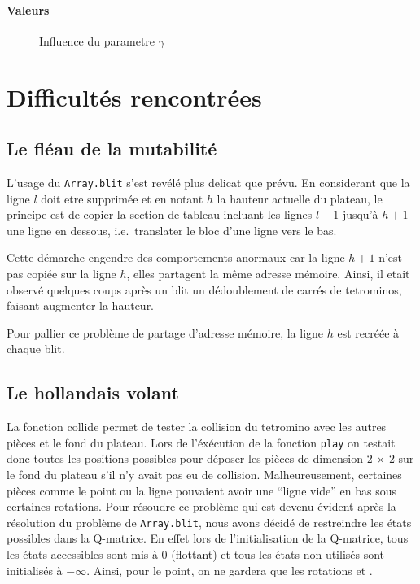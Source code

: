 \documentclass{article}
\begin{document}
\paragraph{Valeurs}
\begin{figure}
  \centering
  \caption{Influence du parametre \(\gamma\)}
\end{figure}


\section{Difficultés rencontrées}

\subsection{Le fl\'eau de la mutabilit\'e}
L'usage du \texttt{Array.blit} s'est revélé plus delicat que prévu. En
considerant que la ligne \(l\) doit etre supprimée et en notant \(h\) la hauteur
actuelle du plateau, le principe est de copier la section de tableau incluant
les lignes \(l+1\) jusqu'à \(h+1\) une ligne en dessous, i.e.\ translater le
bloc d'une ligne vers le bas.

Cette démarche engendre des comportements anormaux car la ligne \(h+1\) n'est
pas copiée sur la ligne \(h\), elles partagent la même adresse mémoire. Ainsi,
il etait observé quelques coups après un blit un dédoublement de carrés de
tetrominos, faisant augmenter la hauteur.

Pour pallier ce problème de partage d'adresse mémoire, la ligne \(h\) est
recréée à chaque blit.

\subsection{Le hollandais volant}
La fonction collide permet de tester la collision du tetromino avec les autres
pièces et le fond du plateau. Lors de l'éxécution de la fonction \texttt{play}
on testait donc toutes les positions possibles pour déposer les pièces de
dimension 2 \(\times \) 2 sur le fond du plateau s'il n'y avait pas eu de
collision. Malheureusement, certaines pièces comme le point ou la ligne
pouvaient avoir une ``ligne vide'' en bas sous certaines rotations. Pour
résoudre ce problème qui est devenu évident après la résolution du problème de
\texttt{Array.blit}, nous avons décidé de restreindre les états possibles dans
la Q-matrice. En effet lors de l'initialisation de la Q-matrice, tous les états
accessibles sont mis à 0 (flottant) et tous les états non utilisés sont
initialisés à \(-\infty \). Ainsi, pour le point, on ne gardera que les
rotations  et .
\end{document}
